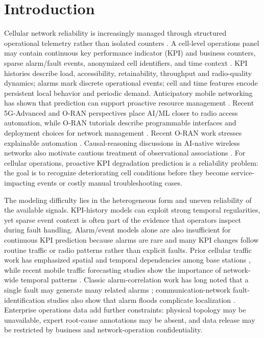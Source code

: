 \section{Introduction}

Cellular network reliability is increasingly managed through structured operational telemetry rather than isolated counters \cite{lin2023embracing,polese2023oran}. A cell-level operations panel may contain continuous key performance indicator (KPI) and business counters, sparse alarm/fault events, anonymized cell identifiers, and time context \cite{zhang2019deepmobile,feng2024multiservice}. KPI histories describe load, accessibility, retainability, throughput and radio-quality dynamics; alarms mark discrete operational events; cell and time features encode persistent local behavior and periodic demand. Anticipatory mobile networking has shown that prediction can support proactive resource management \cite{bui2017anticipatory}. Recent 5G-Advanced and O-RAN perspectives place AI/ML closer to radio access automation, while O-RAN tutorials describe programmable interfaces and deployment choices for network management \cite{alam2026oransurvey}. Recent O-RAN work stresses explainable automation \cite{brik2025xaioran}. Causal-reasoning discussions in AI-native wireless networks also motivate cautious treatment of observational associations \cite{thomas2024causalreasoning}. For cellular operations, proactive KPI degradation prediction is a reliability problem: the goal is to recognize deteriorating cell conditions before they become service-impacting events or costly manual troubleshooting cases.

The modeling difficulty lies in the heterogeneous form and uneven reliability of the available signals. KPI-history models can exploit strong temporal regularities, yet sparse event context is often part of the evidence that operators inspect during fault handling. Alarm/event models alone are also insufficient for continuous KPI prediction because alarms are rare and many KPI changes follow routine traffic or radio patterns rather than explicit faults. Prior cellular traffic work has emphasized spatial and temporal dependencies among base stations \cite{wang2017spatiotemporal}, while recent mobile traffic forecasting studies show the importance of network-wide temporal patterns \cite{sun2022mobiletraffic}. Classic alarm-correlation work has long noted that a single fault may generate many related alarms \cite{jakobson1993alarm}; communication-network fault-identification studies also show that alarm floods complicate localization \cite{bouloutas1994alarm}. Enterprise operations data add further constraints: physical topology may be unavailable, expert root-cause annotations may be absent, and data release may be restricted by business and network-operation confidentiality.

